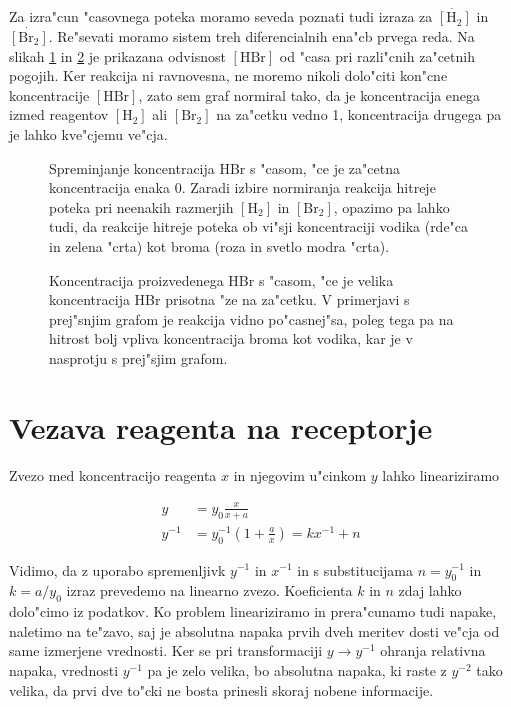 \documentclass[a4paper,10pt]{article}
\newcommand{\HH}{\ensuremath{[\mathrm{H_2}]}}
\newcommand{\BBr}{\ensuremath{[\mathrm{Br_2}]}}
\newcommand{\HBr}{\ensuremath{[\mathrm{HBr}]}}
\begin{document}
Za izra"cun "casovnega poteka moramo seveda poznati tudi izraza za $\dot{\HH}$ in $\dot{\BBr}$. Re"sevati moramo sistem treh diferencialnih ena"cb prvega reda. Na slikah \ref{fig:stopnje} in \ref{fig:stopnje-hbr} je prikazana odvisnost $\HBr$ od "casa pri razli"cnih za"cetnih pogojih. Ker reakcija ni ravnovesna, ne moremo nikoli dolo"citi kon"cne koncentracije $\HBr$, zato sem graf normiral tako, da je koncentracija enega izmed reagentov $\HH$ ali $\BBr$ na za"cetku vedno 1, koncentracija drugega pa je lahko kve"cjemu ve"cja. 

\begin{figure}
 
  \caption{Spreminjanje koncentracija HBr s "casom, "ce je za"cetna koncentracija enaka 0. Zaradi izbire normiranja reakcija hitreje poteka pri neenakih razmerjih $\HH$ in $\BBr$, opazimo pa lahko tudi, da reakcije hitreje poteka ob vi"sji koncentraciji vodika (rde"ca in zelena "crta) kot broma (roza in svetlo modra "crta). }
\label{fig:stopnje}
\end{figure}

\begin{figure}
 
  \caption{Koncentracija proizvedenega HBr s "casom, "ce je velika koncentracija HBr prisotna "ze na za"cetku. V primerjavi s prej"snjim grafom je reakcija vidno po"casnej"sa, poleg tega pa na hitrost bolj vpliva koncentracija broma kot vodika, kar je v nasprotju s prej"sjim grafom.  }
\label{fig:stopnje-hbr}
\end{figure}

\clearpage

\section{Vezava reagenta na receptorje}

Zvezo med koncentracijo reagenta $x$ in njegovim u"cinkom $y$ lahko lineariziramo

\begin{align}
 y &= y_0\frac{x}{x+a} \\
  y^{-1} &= y_0^{-1} \left( 1 + \frac{a}{x} \right) = k x^{-1} + n
\end{align}

Vidimo, da z uporabo spremenljivk $y^{-1}$ in $x^{-1}$ in s substitucijama $n = y_0^{-1}$ in $k = a/y_0$ izraz prevedemo na linearno zvezo. Koeficienta $k$ in $n$ zdaj lahko dolo"cimo iz podatkov. Ko problem lineariziramo in prera"cunamo tudi napake, naletimo na te"zavo, saj je absolutna napaka prvih dveh meritev dosti ve"cja od same izmerjene vrednosti. Ker se pri transformaciji $y\to y^{-1}$ ohranja relativna napaka, vrednosti $y^{-1}$ pa je zelo velika, bo absolutna napaka, ki raste z $y^{-2}$ tako velika, da prvi dve to"cki ne bosta prinesli skoraj nobene informacije. 
\end{document}
